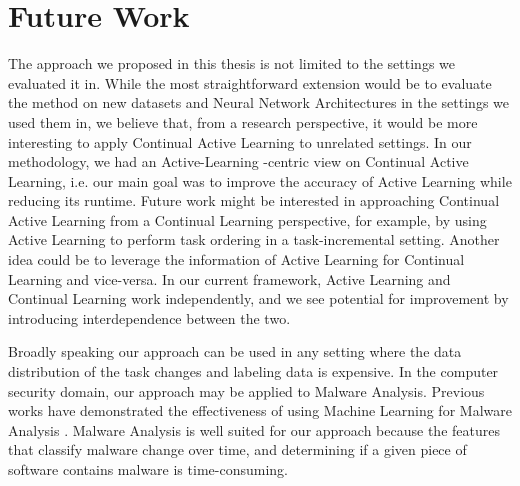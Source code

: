 \section{Future Work}
\label{sec:Conclusion:FutureWork}
The approach we proposed in this thesis is not limited to the settings we evaluated it in. While the most straightforward extension would
be to evaluate the method on new datasets and Neural Network Architectures in the settings we used them in, we believe that, from a research
perspective, it would be more interesting to apply Continual Active Learning to unrelated settings. In our methodology, we had an Active-Learning
-centric view on Continual Active Learning, i.e. our main goal was to improve the accuracy of Active Learning while reducing its runtime. Future
work might be interested in approaching Continual Active Learning from a Continual Learning perspective, for example, by using Active Learning to
perform task ordering in a task-incremental setting. Another idea could be to leverage the information of Active Learning for Continual Learning
and vice-versa. In our current framework, Active Learning and Continual Learning work independently, and we see potential for improvement by 
introducing interdependence between the two. \par
Broadly speaking our approach can be used in any setting where the data distribution of the task changes and labeling data is expensive.
In the computer security domain, our approach may be applied to Malware Analysis. Previous works have demonstrated the effectiveness of using
Machine Learning for Malware Analysis \cite{nath2014static} \cite{ijaz2019static}. Malware Analysis is well suited for our approach
because the features that classify malware change over time, and determining if a given piece of software contains malware is time-consuming.